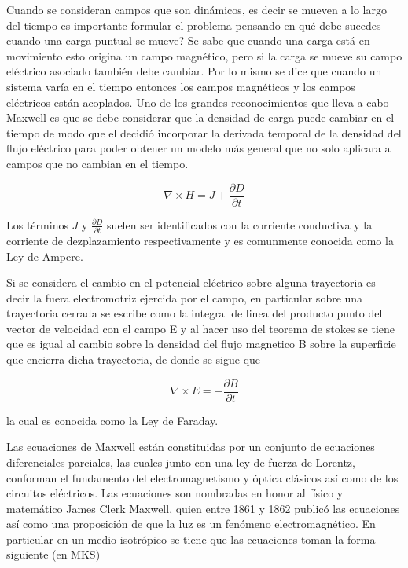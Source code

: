 \documentclass[]{article}
\begin{document}
Cuando se consideran campos que son dinámicos, es decir se mueven a lo
largo del tiempo es importante formular el problema pensando en qué debe
sucedes cuando una carga puntual se mueve? Se sabe que cuando una carga
está en movimiento esto origina un campo magnético, pero si la carga se
mueve su campo eléctrico asociado también debe cambiar. Por lo mismo se
dice que cuando un sistema varía en el tiempo entonces los campos
magnéticos y los campos eléctricos están acoplados. Uno de los grandes
reconocimientos que lleva a cabo Maxwell es que se debe considerar que
la densidad de carga puede cambiar en el tiempo de modo que el decidió
incorporar la derivada temporal de la densidad del flujo eléctrico para
poder obtener un modelo más general que no solo aplicara a campos que no
cambian en el tiempo.

\begin{equation}
\nabla \times H = J + \frac{\partial D}{\partial t}
\end{equation}

Los términos \(J\) y \(\frac{\partial D}{\partial t}\) suelen ser
identificados con la corriente conductiva y la corriente de
dezplazamiento respectivamente y es comunmente conocida como la Ley de
Ampere.

Si se considera el cambio en el potencial eléctrico sobre alguna
trayectoria es decir la fuera electromotriz ejercida por el campo, en
particular sobre una trayectoria cerrada se escribe como la integral de
linea del producto punto del vector de velocidad con el campo E y al
hacer uso del teorema de stokes se tiene que es igual al cambio sobre la
densidad del flujo magnetico B sobre la superficie que encierra dicha
trayectoria, de donde se sigue que

\begin{equation}
\nabla \times E = - \frac{\partial B}{\partial t}
\end{equation}

la cual es conocida como la Ley de Faraday.

Las ecuaciones de Maxwell están constituidas por un conjunto de
ecuaciones diferenciales parciales, las cuales junto con una ley de
fuerza de Lorentz, conforman el fundamento del electromagnetismo y
óptica clásicos así como de los circuitos eléctricos. Las ecuaciones son
nombradas en honor al físico y matemático James Clerk Maxwell, quien
entre 1861 y 1862 publicó las ecuaciones así como una proposición de que
la luz es un fenómeno electromagnético. En particular en un medio
isotrópico se tiene que las ecuaciones toman la forma siguiente (en MKS)
\end{document}
